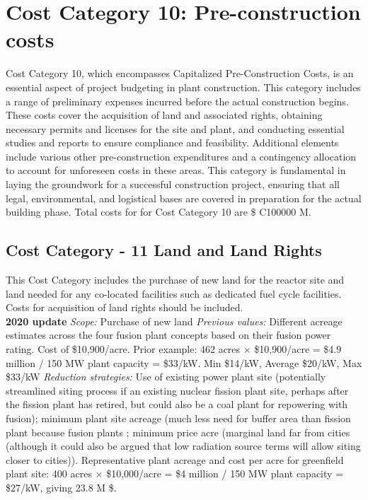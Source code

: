 

\section{Cost Category 10: Pre-construction costs}

Cost Category 10, which encompasses Capitalized Pre-Construction Costs, is an essential aspect of project budgeting in plant construction. This category includes a range of preliminary expenses incurred before the actual construction begins. These costs cover the acquisition of land and associated rights, obtaining necessary permits and licenses for the site and plant, and conducting essential studies and reports to ensure compliance and feasibility. Additional elements include various other pre-construction expenditures and a contingency allocation to account for unforeseen costs in these areas. This category is fundamental in laying the groundwork for a successful construction project, ensuring that all legal, environmental, and logistical bases are covered in preparation for the actual building phase.  Total costs for for Cost Category 10 are \$ C100000 M.

\subsection*{Cost Category - 11 Land and Land Rights}
This Cost Category includes the purchase of new land for the reactor site and land needed for any co-located facilities such as dedicated fuel cycle facilities.  Costs for acquisition of land rights should be included. \\

\textbf{2020 update}
\emph{Scope: }Purchase of new land
\emph{Previous values: }
Different acreage estimates across the four fusion plant concepts based on their fusion power rating. Cost of \$10,900/acre.
Prior example: 462 acres $\times$ \$10,900/acre = \$4.9 million / 150 MW plant capacity =  \$33/kW.  Min \$14/kW, Average \$20/kW, Max \$33/kW
\emph{Reduction strategies: }
Use of existing power plant site (potentially streamlined siting process if an existing nuclear fission plant site, perhaps after the fission plant has retired, but could also be a coal plant for repowering with fusion); minimum plant site acreage (much less need for buffer area than fission plant because fusion plants ; minimum price acre (marginal land far from cities (although it could also be argued that low radiation source terms will allow siting closer to cities)).
Representative plant acreage and cost per acre for greenfield plant site: 400 acres $\times$ \$10,000/acre = \$4 million / 150 MW plant capacity = \$27/kW, giving 23.8 M \$.  \\

